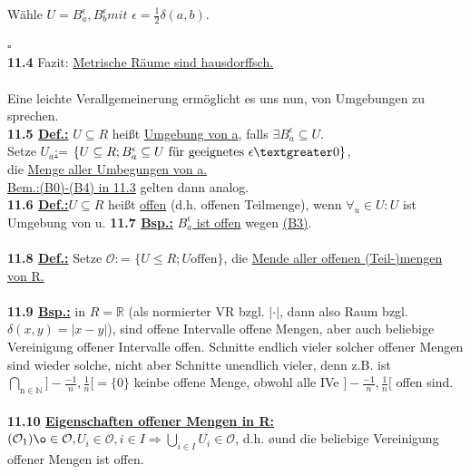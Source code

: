 \documentclass[]{scrartcl}
\begin{document}
	Wähle $U=B_a^\epsilon, B_b^\epsilon mit$ \ul{$\epsilon=\frac{1}{2}\delta(a,b)$}.\\
	\strut\hfill$\square$\\
	\textbf{11.4} Fazit:  \ul{Metrische Räume sind hausdorffsch.}\\
	\\
	Eine leichte Verallgemeinerung ermöglicht es uns nun, von Umgebungen zu sprechen.\\
	\textbf{11.5 \underline{Def.:}} $U \subseteq R$ heißt  \ul{Umgebung von a}, falls $\exists B_a^\epsilon\subseteq U$.\\
	Setze  \ul{$U_a$:}= $\{U\subseteq R; B_a^\epsilon \subseteq U \text{ für geeignetes }\epsilon \textgreater 0\}$,\\
	die \ul{Menge aller Umbegungen von a.}\\
	\underline{Bem.:}\ul{(B0)-(B4) in 11.3} gelten dann analog.\\
	\textbf{11.6 \underline{Def.:}}$U\subseteq R$ heißt \ul{offen} (d.h. offenen Teilmenge), wenn $\forall_u \in U:U$ ist Umgebung von u.
	\textbf{11.7 \underline{Bsp.:}}  \ul{$B_a^\epsilon$ ist offen} wegen  \ul{(B3)}.\\
	\\ 
	\textbf{11.8 \underline{Def.:}} Setze \ul{$\mathcal{O}:$}= $\{U\leq R; U \text{offen}\}$, die \ul{Mende aller offenen (Teil-)mengen von R.}\\
	\\
	\textbf{11.9 \underline{Bsp.:}} in $R=\mathbb{R}$ (als normierter VR bzgl. $|\cdot|$, dann also Raum bzgl. $\delta(x,y)=|x-y|$), sind offene Intervalle offene Mengen, aber auch beliebige Vereinigung offener Intervalle offen. Schnitte endlich vieler solcher offener Mengen sind wieder solche, nicht aber Schnitte unendlich vieler, denn z.B. ist \\
	$\bigcap_{\text{n}\in \mathbb{N}}]-\frac{-1}{n},\frac{1}{n}[=\{0\}$ keinbe offene Menge, obwohl alle IVe $]-\frac{-1}{n},\frac{1}{n}[$ offen sind.\\
	\\
	\textbf{11.10 \underline{Eigenschaften offener Mengen in R:}}\\
	$(\mathcal{O}_1) \o \in \mathcal{O}, $\ul{$U_i\in \mathcal{O},i\in I \Rightarrow \bigcup_{i\in I} U_i \in \mathcal{O}$}, d.h. \o und die beliebige Vereinigung offener Mengen ist offen.\\
\end{document}
